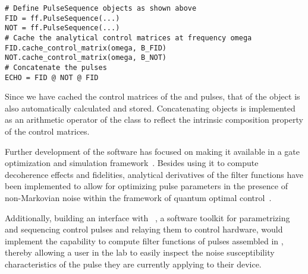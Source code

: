 \begin{verbatim}
# Define PulseSequence objects as shown above
FID = ff.PulseSequence(...)
NOT = ff.PulseSequence(...)
# Cache the analytical control matrices at frequency omega
FID.cache_control_matrix(omega, B_FID)
NOT.cache_control_matrix(omega, B_NOT)
# Concatenate the pulses
ECHO = FID @ NOT @ FID
\end{verbatim}

Since we have cached the control matrices of the  and  pulses, that of the  object is also automatically calculated and stored.
Concatenating \pulsesequence objects is implemented as an arithmetic operator of the class to reflect the intrinsic composition property of the control matrices.

Further development of the software has focused on making it available in a gate optimization and simulation framework~\cite{Teske2022a}.
Besides using it to compute decoherence effects and fidelities, analytical derivatives of the filter functions have been implemented to allow for optimizing pulse parameters in the presence of non-Markovian noise within the framework of quantum optimal control~\cite{Le2022,Teske2022}.

Additionally, building an interface with \qupulse~\cite{Humpohl2025,Humpohl2021}, a software toolkit for parametrizing and sequencing control pulses and relaying them to control hardware, would implement the capability to compute filter functions of pulses assembled in \qupulse, thereby allowing a user in the lab to easily inspect the noise susceptibility characteristics of the pulse they are currently applying to their device.
